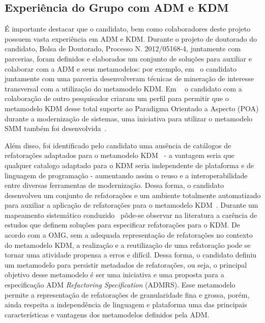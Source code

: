 \documentclass[12pt]{article}
\begin{document}
\subsection{Experiência do Grupo com ADM e KDM}

É importante destacar que o candidato, bem como colaboradores deste projeto possuem vasta experiência em ADM e KDM. Durante o projeto de doutorado do candidato, Bolsa de Doutorado, Processo N. 2012/05168-4, juntamente com parcerias, foram definidos e elaborados um conjunto de soluções para auxiliar e colaborar com a ADM e seus metamodelos: por exemplo, em~\cite{dani_san_tool, dani_san, daniel_san_journal} o candidato juntamente com uma parceria desenvolveram técnicas de mineração de interesse transversal com a utilização do metamodelo KDM. Em ~\cite{Santos_2014, santo_wmod} o candidato com a colaboração de outro pesquisador criaram um perfil para permitir que o metamodelo KDM desse total suporte ao Paradigma Orientado a Aspecto (POA) durante a modernização de sistemas, uma iniciativa para utilizar o metamodelo SMM também foi desenvolvida~\cite{honda_dissertacao}. 

Além disso, foi identificado pelo candidato uma ausência de catálogos de refatorações adaptados para o metamodelo KDM~\cite{durelli_systematic_mapping} - a vantagem seria que qualquer catalogo adaptado para o KDM seria independente de plataforma e de linguagem de programação - aumentando assim o reuso e a interoperabilidade entre diversas ferramentas de modernização. Dessa forma, o candidato desenvolveu um conjunto de refatorações e um ambiente totalmente automatizado para auxiliar a aplicação de refatorações para o metamodelo KDM~\cite{durelli_catalogo, durelli_VEM_ferramenta}. Durante um mapeamento sistemático conduzido~\cite{durelli_systematic_mapping} pôde-se observar na literatura a carência de estudos que definem soluções para especificar refatorações para o KDM. De acordo com a OMG, sem a adequada representação de refatorações no contexto do metamodelo KDM, a realização e a reutilização de uma refatoração pode se tornar uma atividade propensa a erros e difícil. Dessa forma, o candidato definiu um metamodelo para persistir metadados de refatorações, ou seja, o principal objetivo desse metamodelo é ser uma iniciativa e uma proposta para a especificação ADM \textit{Refactoring Specification} (ADMRS). Esse metamodelo permite a representação de refatorações de granularidade fina e grossa, porém, ainda respeita a independência de linguagem e plataforma uma das principais características e vantagens dos metamodelos definidos pela ADM. 
\end{document}
